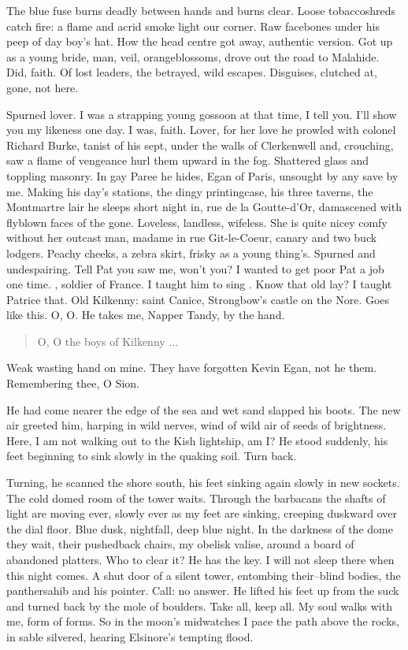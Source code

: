The blue fuse burns deadly between hands and burns clear.
Loose tobaccoshreds catch fire:
a flame and acrid smoke light our corner.
Raw facebones under his peep of day boy's hat.
How the head centre got away,
authentic version.
Got up as a young bride,
man, veil, orangeblossoms,
drove out the road to Malahide.
Did, faith.
Of lost leaders, the betrayed, wild escapes.
Disguises, clutched at, gone, not here.

Spurned lover.
I was a strapping young gossoon at that time, I tell you.
I'll show you my likeness one day.
I was, faith.
Lover,
for her love
he prowled with colonel Richard Burke,
tanist of his sept,
under the walls of Clerkenwell
and, crouching,
saw a flame of vengeance hurl them upward in the fog.
Shattered glass and toppling masonry.
In gay Paree he hides,
Egan of Paris,
unsought by any save by me.
Making his day's stations,
the dingy printingcase,
his three taverns,
the Montmartre lair he sleeps short night in,
rue de la Goutte-d'Or,
damascened with flyblown faces of the gone.
Loveless, landless, wifeless.
She is quite nicey comfy without her outcast man,
madame in rue Git-le-Coeur,
canary and two buck lodgers.
Peachy cheeks, a zebra skirt, frisky as a young thing's.
Spurned and undespairing.
Tell Pat you saw me, won't you?
I wanted to get poor Pat a job one time.
, soldier of France.
I taught him to sing
.
Know that old lay?
I taught Patrice that.
Old Kilkenny:
saint Canice, Strongbow's castle on the Nore.
Goes like this.
O, O.
He takes me, Napper Tandy, by the hand.


\begin{verse}
    O, O the boys of Kilkenny ...
\end{verse}


Weak wasting hand on mine.
They have forgotten Kevin Egan,
not he them.
Remembering thee, O Sion.

He had come nearer the edge of the sea and wet sand slapped his boots.
The new air greeted him, harping in wild nerves,
wind of wild air
of seeds of brightness.
Here,
I am not walking out to the Kish lightship,
am I?
He stood suddenly,
his feet beginning to sink slowly in the quaking soil.
Turn back.

Turning, he scanned the shore south,
his feet sinking again slowly in new sockets.
The cold domed room of the tower waits.
Through the barbacans
the shafts of light are moving ever,
slowly ever as my feet are sinking,
creeping duskward over the dial floor.
Blue dusk, nightfall, deep blue night.
In the darkness of the dome
they wait, their pushedback chairs,
my obelisk valise,
around a board of abandoned platters.
Who to clear it?
He has the key.
I will not sleep there when this night comes.
A shut door of a silent tower,
entombing their--blind bodies,
the panthersahib and his pointer.
Call:
no answer.
He lifted his feet up from the suck
and turned back by the mole of boulders.
Take all, keep all.
My soul walks with me, form of forms.
So in the moon's midwatches
I pace the path above the rocks,
in sable silvered, hearing Elsinore's tempting flood.

